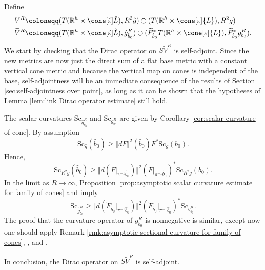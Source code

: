 \documentclass[12pt, reqno]{amsart}
\theoremstyle{plain} %
\theoremstyle{definition}
\theoremstyle{remark}
\numberwithin{equation}{section}
\newcommand{\dom}[1]{\hat{#1}}
\newcommand{\onorm}[1]{\Vert #1 \Vert}
\newcommand{\field}[1]{\mathbb{#1}}
\newcommand{\R}{\field{R}}
\newcommand{\Sc}{\mathrm{Sc}}
\newcommand{\hdim}{h} %
\begin{document}
Define
\begin{align*}
    V^R &\coloneqq (T(\R^\hdim \times \cone[\dom{\varepsilon}]{\dom{L}}), R^2 \dom{g}) \oplus (T(\R^\hdim \times \cone[\varepsilon]{L}), R^2 g) \\
    \widetilde{V}^R &\coloneqq (T(\R^\hdim \times \cone[\dom{\varepsilon}]{\dom{L}}), \dom{g}_{\dom{b}_0}^R) \oplus (\widetilde{F}_{\dom{b}_0}^*T(\R^\hdim \times \cone[\varepsilon]{L}), \widetilde{F}_{\dom{b}_0}^*g_{b_0}^R).
\end{align*}
We start by checking that the Dirac operator on \(S\widetilde{V}^R\) is self-adjoint.
Since the new metrics are now just the direct sum of a flat base metric with a constant vertical cone metric and because the vertical map on cones is independent of the base, self-adjointness will be an immediate consequence of the results of Section \ref{sec:self-adjointness over point}, as long as it can be shown that the hypotheses of Lemma \ref{lem:link Dirac operator estimate} still hold.

The scalar curvatures \(\Sc_{\dom{g}_{\dom{b}_0}^R}\) and \(\Sc_{g_{b_0}^R}\) are given by Corollary \ref{cor:scalar curvature of cone}.
By assumption
\begin{equation*}
    \Sc_{\hat{g}}(\dom{b}_0) \geq \onorm{dF}^2(\dom{b}_0) F^*\Sc_g(b_0).
\end{equation*}
Hence,
\begin{equation*}
    \Sc_{ R^2 \hat{g} }(\dom{b}_0) \geq \onorm{d(F|_{\pi^{-1}\dom{b}_0})}^2 (F|_{\pi^{-1}\dom{b}_0})^*\Sc_{ R^2 g }(b_0).
\end{equation*}
In the limit as \(R \to \infty\), Proposition \ref{prop:asymptotic scalar curvature estimate for family of cones} and \cite[Proposition~2.17]{Streil:2016} imply
\begin{equation}\label{eqn:scalar curvature comparison - reduction to model case}
    \Sc_{\dom{g}_{\dom{b}_0}^R} \geq \onorm{d(\widetilde{F}_{\dom{b}_0}|_{\pi^{-1}\dom{b}_0})}^2 (\widetilde{F}_{\dom{b}_0}|_{\pi^{-1}\dom{b}_0})^*\Sc_{g_{b_0}^R}.
\end{equation}
The proof that the curvature operator of \(g_{b_0}^R\) is nonnegative is similar, except now one should apply Remark \ref{rmk:asymptotic sectional curvature for family of cones}, \cite[Proposition~2.8]{Streil:2016}, and \cite[Lemma~2.15]{Streil:2016}.

In conclusion, the Dirac operator on \(S\widetilde{V}^R\) is self-adjoint.
\end{document}
